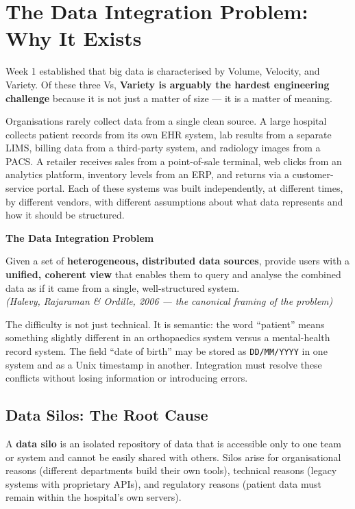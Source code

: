 \documentclass[12pt,a4paper]{article}
\newcommand{\defbox}[2]{%
  \noindent
  \colorbox{PUNavy!12}{%
    \begin{minipage}{\dimexpr\linewidth-2\fboxsep}
      \vspace{4pt}\textbf{\textcolor{PUNavy}{#1}}\par\vspace{2pt}
      #2\vspace{4pt}
    \end{minipage}%
  }\par\vspace{6pt}%
}
\begin{document}
\vspace{8pt}

\section{The Data Integration Problem: Why It Exists}

Week 1 established that big data is characterised by Volume, Velocity, and Variety.  Of these three Vs, \textbf{Variety is arguably the hardest engineering challenge} because it is not just a matter of size — it is a matter of meaning.

Organisations rarely collect data from a single clean source.  A large hospital collects patient records from its own EHR system, lab results from a separate LIMS, billing data from a third-party system, and radiology images from a PACS.  A retailer receives sales from a point-of-sale terminal, web clicks from an analytics platform, inventory levels from an ERP, and returns via a customer-service portal.  Each of these systems was built independently, at different times, by different vendors, with different assumptions about what data represents and how it should be structured.

\defbox{The Data Integration Problem}{Given a set of \textbf{heterogeneous, distributed data sources}, provide users with a \textbf{unified, coherent view} that enables them to query and analyse the combined data as if it came from a single, well-structured system.\\\medskip
\textit{(Halevy, Rajaraman \& Ordille, 2006 --- the canonical framing of the problem)}}

The difficulty is not just technical.  It is semantic: the word ``patient'' means something slightly different in an orthopaedics system versus a mental-health record system.  The field ``date of birth'' may be stored as \texttt{DD/MM/YYYY} in one system and as a Unix timestamp in another.  Integration must resolve these conflicts without losing information or introducing errors.

\subsection{Data Silos: The Root Cause}

A \textbf{data silo} is an isolated repository of data that is accessible only to one team or system and cannot be easily shared with others.  Silos arise for organisational reasons (different departments build their own tools), technical reasons (legacy systems with proprietary APIs), and regulatory reasons (patient data must remain within the hospital's own servers).
\end{document}
